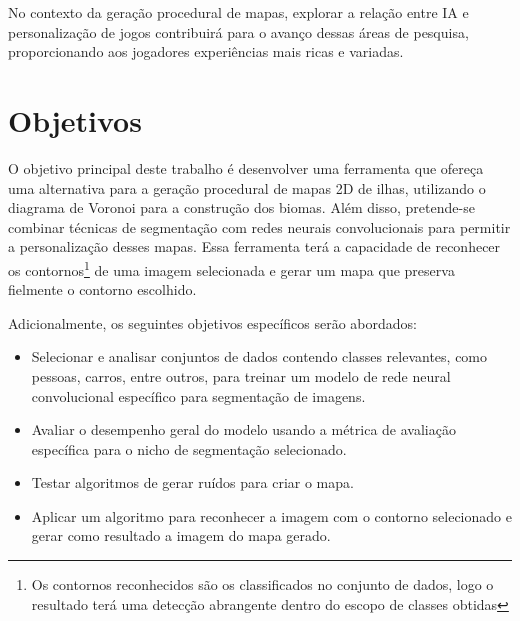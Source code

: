 No contexto da geração procedural de mapas, explorar a relação entre IA e personalização de jogos contribuirá para o avanço dessas áreas de pesquisa, proporcionando aos jogadores experiências mais ricas e variadas.



\section{Objetivos}

O objetivo principal deste trabalho é desenvolver uma ferramenta que ofereça uma alternativa para a geração procedural de mapas 2D de ilhas, utilizando o diagrama de Voronoi para a construção dos biomas. Além disso, pretende-se combinar técnicas de segmentação com redes neurais convolucionais para permitir a personalização desses mapas. Essa ferramenta terá a capacidade de reconhecer os contornos\footnote{Os contornos reconhecidos são os classificados no conjunto de dados, logo o resultado terá uma detecção abrangente dentro do escopo de classes obtidas} de uma imagem selecionada e gerar um mapa que preserva fielmente o contorno escolhido.

Adicionalmente, os seguintes objetivos específicos serão abordados:

\begin{itemize}
	\item Selecionar e analisar conjuntos de dados contendo classes relevantes, como pessoas, carros, entre outros, para treinar um modelo de rede neural convolucional específico para segmentação de imagens.
	\item Avaliar o desempenho geral do modelo usando a métrica de avaliação específica para o nicho de segmentação selecionado.
	\item Testar algoritmos de gerar ruídos para criar o mapa.
	\item Aplicar um algoritmo para reconhecer a imagem com o contorno selecionado e gerar como resultado a imagem do mapa gerado.
\end{itemize}

